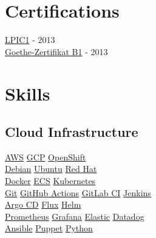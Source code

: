 \documentclass[]{willianpaixao-resume}
\begin{document}
\begin{minipage}[t]{0.35\textwidth}
\section{Certifications}
\href{https://www.lpi.org/certification/get-certified-lpi/lpic-1-linux-server-professional/}{LPIC1} - 2013 \\
\href{https://www.goethe.de/en/spr/kup/prf/prf/gb1.html}{Goethe-Zertifikat B1} - 2013
\sectionsep


\section{Skills}
\subsection{Cloud Infrastructure}
\href{https://aws.amazon.com/}{AWS}\textbullet{}
\href{https://cloud.google.com/}{GCP}\textbullet{}
\href{https://www.redhat.com/en/technologies/cloud-computing/openshift}{OpenShift}\\
\href{https://www.debian.org/}{Debian}\textbullet{}
\href{https://ubuntu.com/}{Ubuntu}\textbullet{}
\href{https://www.redhat.com/}{Red Hat}\\
\href{http://www.docker.com/}{Docker}\textbullet{}
\href{https://aws.amazon.com/ecs/}{ECS}\textbullet{}
\href{https://kubernetes.io/}{Kubernetes}\\
\href{https://git-scm.com/}{Git}\textbullet{}
\href{https://github.com/features/actions}{GitHub Actions}\textbullet{}
\href{https://gitlab.com}{GitLab CI}\textbullet{}
\href{https://jenkins.io/}{Jenkins}\\
\href{https://argo-cd.readthedocs.io/}{Argo CD}\textbullet{}
\href{https://fluxcd.io/}{Flux}\textbullet{}
\href{https://helm.sh/}{Helm}\\
\href{https://prometheus.io/}{Prometheus}\textbullet{}
\href{https://grafana.com/}{Grafana}\textbullet{}
\href{https://www.elastic.co/}{Elastic}\textbullet{}
\href{https://www.datadoghq.com/}{Datadog}\\
\href{https://www.redhat.com/en/technologies/management/ansible}{Ansible}\textbullet{}
\href{https://www.puppet.com/}{Puppet}\textbullet{}
\href{https://www.python.org/}{Python}\\


\end{minipage}
\end{document}
